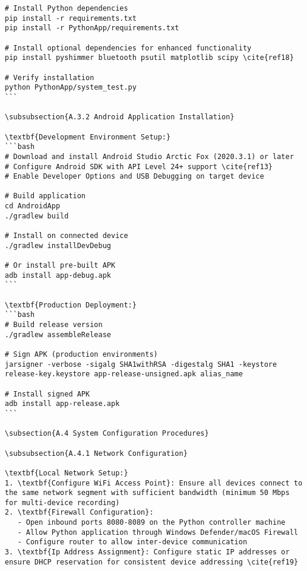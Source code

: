 \begin{verbatim}
# Install Python dependencies
pip install -r requirements.txt
pip install -r PythonApp/requirements.txt

# Install optional dependencies for enhanced functionality
pip install pyshimmer bluetooth psutil matplotlib scipy \cite{ref18}

# Verify installation
python PythonApp/system_test.py
```

\subsubsection{A.3.2 Android Application Installation}

\textbf{Development Environment Setup:}
```bash
# Download and install Android Studio Arctic Fox (2020.3.1) or later
# Configure Android SDK with API Level 24+ support \cite{ref13}
# Enable Developer Options and USB Debugging on target device

# Build application
cd AndroidApp
./gradlew build

# Install on connected device
./gradlew installDevDebug

# Or install pre-built APK
adb install app-debug.apk
```

\textbf{Production Deployment:}
```bash
# Build release version
./gradlew assembleRelease

# Sign APK (production environments)
jarsigner -verbose -sigalg SHA1withRSA -digestalg SHA1 -keystore release-key.keystore app-release-unsigned.apk alias_name

# Install signed APK
adb install app-release.apk
```

\subsection{A.4 System Configuration Procedures}

\subsubsection{A.4.1 Network Configuration}

\textbf{Local Network Setup:}
1. \textbf{Configure WiFi Access Point}: Ensure all devices connect to the same network segment with sufficient bandwidth (minimum 50 Mbps for multi-device recording)
2. \textbf{Firewall Configuration}:
   - Open inbound ports 8080-8089 on the Python controller machine
   - Allow Python application through Windows Defender/macOS Firewall
   - Configure router to allow inter-device communication
3. \textbf{Ip Address Assignment}: Configure static IP addresses or ensure DHCP reservation for consistent device addressing \cite{ref19}


\end{verbatim}
